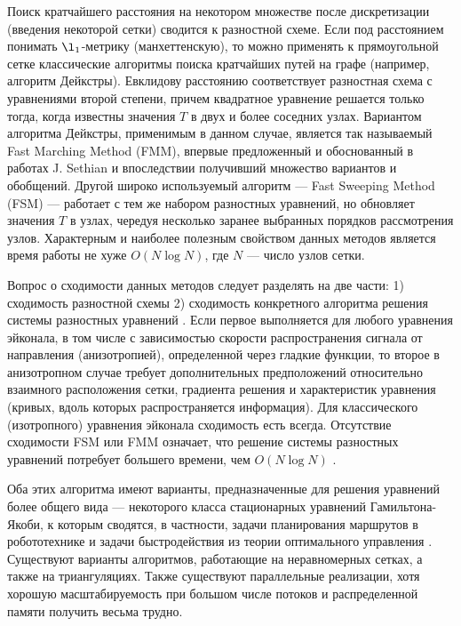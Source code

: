 \documentclass[a4paper,12pt]{article}
\begin{document}
Поиск кратчайшего расстояния на некотором множестве после
дискретизации (введения некоторой сетки) сводится к разностной схеме.
Если под расстоянием понимать $\l_1$-метрику (манхеттенскую), то можно
применять к прямоугольной сетке классические алгоритмы поиска
кратчайших путей на графе (например, алгоритм Дейкстры). Евклидову
расстоянию соответствует разностная схема с уравнениями второй
степени, причем квадратное уравнение решается только тогда, когда
известны значения $T$ в двух и более соседних узлах.  Вариантом
алгоритма Дейкстры, применимым в данном случае, является так
называемый Fast Marching Method (FMM), впервые предложенный и
обоснованный в работах J. Sethian \cite{S1999,AV2003} и впоследствии
получивший множество вариантов и обобщений. Другой широко используемый
алгоритм --- Fast Sweeping Method (FSM) --- работает с тем же набором
разностных уравнений, но обновляет значения $T$ в узлах, чередуя
несколько заранее выбранных порядков рассмотрения узлов.  Характерным
и наиболее полезным свойством данных методов является время работы не
хуже $O(N \log N)$, где $N$ --- число узлов сетки.
 
Вопрос о сходимости данных методов следует разделять на две части: 1)
сходимость разностной схемы 2) сходимость конкретного алгоритма
решения системы разностных уравнений \cite{J2015, A2006}.  Если первое
выполняется для любого уравнения эйконала, в том числе с зависимостью
скорости распространения сигнала от направления (анизотропией),
определенной через гладкие функции, то второе в анизотропном случае
требует дополнительных предположений относительно взаимного
расположения сетки, градиента решения и характеристик уравнения
(кривых, вдоль которых распространяется информация). Для классического
(изотропного) уравнения эйконала сходимость есть всегда.  Отсутствие
сходимости FSM или FMM означает, что решение системы разностных
уравнений потребует большего времени, чем $O(N \log N)$
\cite{E2014}.
 
Оба этих алгоритма имеют варианты, предназначенные для решения
уравнений более общего вида --- некоторого класса стационарных
уравнений Гамильтона-Якоби, к которым сводятся, в частности, задачи
планирования маршрутов в робототехнике и задачи быстродействия из
теории оптимального управления \cite{L2016}.  Существуют варианты
алгоритмов, работающие на неравномерных сетках, а также на
триангуляциях\cite{FSA2007}. Также существуют параллельные реализации,
хотя хорошую масштабируемость при большом числе потоков и
распределенной памяти получить весьма трудно.
\end{document}

